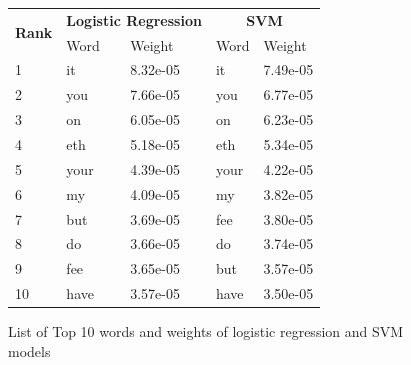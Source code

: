 \documentclass[transmag]{IEEEtran}
\begin{document}
\begin{figure}[h]
\begin{center}
\begin{tabular}{|l|ll|ll|}
\hline
\multicolumn{1}{|c|}{\multirow{2}{*}{\textbf{Rank}}} & \multicolumn{2}{c|}{\textbf{Logistic Regression}} & \multicolumn{2}{c|}{\textbf{SVM}}    \\ \cline{2-5} 
\multicolumn{1}{|c|}{}                               & \multicolumn{1}{l|}{Word}        & Weight         & \multicolumn{1}{l|}{Word} & Weight   \\ \hline
1                                                    & \multicolumn{1}{l|}{it}          & 8.32e-05       & \multicolumn{1}{l|}{it}   & 7.49e-05 \\ \hline
2                                                    & \multicolumn{1}{l|}{you}         & 7.66e-05       & \multicolumn{1}{l|}{you}  & 6.77e-05 \\ \hline
3                                                    & \multicolumn{1}{l|}{on}          & 6.05e-05       & \multicolumn{1}{l|}{on}   & 6.23e-05 \\ \hline
4                                                    & \multicolumn{1}{l|}{eth}         & 5.18e-05       & \multicolumn{1}{l|}{eth}  & 5.34e-05 \\ \hline
5                                                    & \multicolumn{1}{l|}{your}        & 4.39e-05       & \multicolumn{1}{l|}{your} & 4.22e-05 \\ \hline
6                                                    & \multicolumn{1}{l|}{my}          & 4.09e-05       & \multicolumn{1}{l|}{my}   & 3.82e-05 \\ \hline
7                                                    & \multicolumn{1}{l|}{but}         & 3.69e-05       & \multicolumn{1}{l|}{fee}  & 3.80e-05 \\ \hline
8                                                    & \multicolumn{1}{l|}{do}          & 3.66e-05       & \multicolumn{1}{l|}{do}   & 3.74e-05 \\ \hline
9                                                    & \multicolumn{1}{l|}{fee}         & 3.65e-05       & \multicolumn{1}{l|}{but}  & 3.57e-05 \\ \hline
10                                                   & \multicolumn{1}{l|}{have}        & 3.57e-05       & \multicolumn{1}{l|}{have} & 3.50e-05 \\ \hline
\end{tabular}
\end{center}
\caption{List of Top 10 words and weights of logistic regression and SVM models}
    \label{tab:top10words}
\end{figure}
\end{document}
